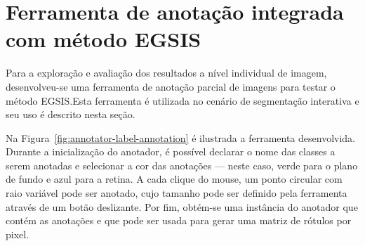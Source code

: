 \section{Ferramenta de anotação integrada com método EGSIS}\label{sec:ferramenta-anotacao}

Para a exploração e avaliação dos resultados a nível individual de
imagem, desenvolveu-se uma ferramenta de anotação parcial de imagens
para testar o método EGSIS.\@ Esta ferramenta é utilizada no cenário de
segmentação interativa e seu uso é descrito nesta seção.


\begin{figure}[h!]
        \captionsetup{width=16cm}
		\centering
\end{figure}
\FloatBarrier{}


Na Figura~\ref{fig:annotator-label-annotation} é ilustrada a ferramenta
desenvolvida. Durante a inicialização do anotador, é possível declarar
o nome das classes a serem anotadas e selecionar a cor das anotações
{---} neste caso, verde para o plano de fundo e azul para a retina. A
cada clique do mouse, um ponto circular com raio variável pode ser
anotado, cujo tamanho pode ser definido pela ferramenta através de um
botão deslizante. Por fim, obtém-se uma instância do anotador que
contém as anotações e que pode ser usada para gerar uma matriz de
rótulos por pixel.

